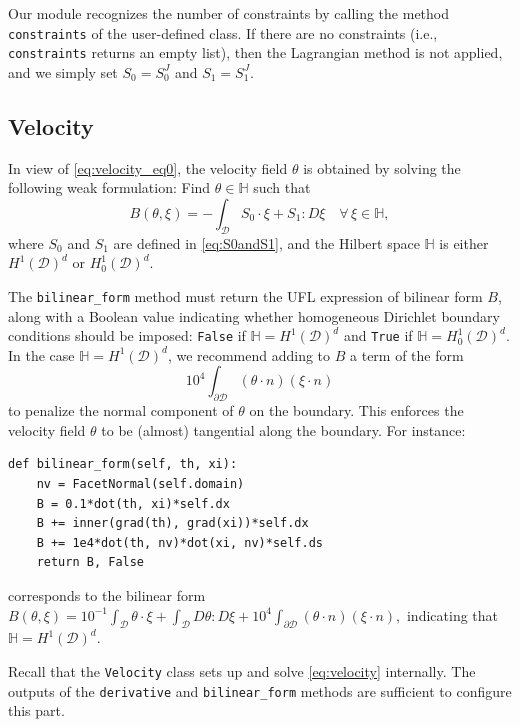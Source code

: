 \documentclass[preprint,9pt]{elsarticle}
\begin{document}
Our module recognizes the number of constraints by calling
the method \texttt{constraints} of the user-defined class.
If there are no constraints (i.e., \texttt{constraints} returns an empty list),
then the Lagrangian method is not applied, and we simply set
$S_0 = S_0^J$ and $S_1 = S_1^J$.

\subsection{Velocity}\label{sub:velocity}

In view of \eqref{eq:velocity_eq0}, the velocity field $\theta$
is obtained by solving the following weak formulation:
Find $\theta\in\mathbb{H}$ such that
\begin{equation} \label{eq:velocity}
	B (\theta,\xi) =
	-\int_{\mathcal{D}} S_0 \cdot \xi + S_1 \colon\! D\xi
	\quad\forall\,\xi\in\mathbb{H},
\end{equation}
where $S_0$ and $S_1$ are defined in \eqref{eq:S0andS1}, and
the Hilbert space $\mathbb{H}$ is either
$H^1(\mathcal{D})^d$ or $H_0^1(\mathcal{D})^d$.

The \texttt{bilinear\_form} method must return 
the UFL expression of bilinear form $B$, along with
a Boolean value indicating whether homogeneous Dirichlet boundary conditions
should be imposed:
\texttt{False} if $\mathbb{H} = H^1(\mathcal{D})^d$ and
\texttt{True} if $\mathbb{H} = H_0^1(\mathcal{D})^d$.
In the case $\mathbb{H} = H^1(\mathcal{D})^d$,
we recommend adding to $B$ a term of the form
\begin{equation}\label{eq:bd_plt}
	{10}^4 \int_{\partial \mathcal{D}}  (\theta \cdot n) (\xi \cdot n)
\end{equation}
to penalize the normal component of $\theta$ on the boundary.
This enforces the velocity field $\theta$ to be
(almost) tangential along the boundary.
For instance:
\begin{lstlisting}
def bilinear_form(self, th, xi):
	nv = FacetNormal(self.domain)
	B = 0.1*dot(th, xi)*self.dx
	B += inner(grad(th), grad(xi))*self.dx
	B += 1e4*dot(th, nv)*dot(xi, nv)*self.ds
	return B, False
\end{lstlisting}
corresponds to the bilinear form
$
	B(\theta,\xi) = {10}^{-1} \int_{\mathcal{D}} \theta \cdot \xi + 
	\int_{\mathcal{D}} D\theta \colon\! D\xi
	+{10}^4 \int_{\partial \mathcal{D}} (\theta \cdot n) (\xi \cdot n),	
$	
indicating that $\mathbb{H} = H^1(\mathcal{D})^d$.

Recall that the \texttt{Velocity} class sets up
and solve \eqref{eq:velocity} internally.
The outputs of the \texttt{derivative} and \texttt{bilinear\_form} methods
are sufficient to configure this part. 
\end{document}
